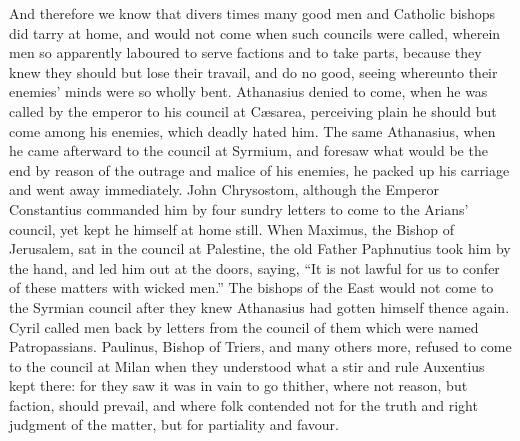 And therefore we know that divers times many good men and Catholic
bishops did tarry at home, and would not come when such councils were
called, wherein men so apparently laboured to serve factions and to
take parts, because they knew they should but lose their travail, and
do no good, seeing whereunto their enemies’ minds were so wholly
bent. Athanasius denied to come, when he was called by the emperor
to his council at Cæsarea, perceiving plain he should but come
among his enemies, which deadly hated him. The same Athanasius,
when he came afterward to the council at Syrmium, and foresaw what would
be the end by reason of the outrage and malice of his enemies, he packed
up his carriage and went away immediately. John Chrysostom, although
the Emperor Constantius commanded him by four sundry
letters to come to the Arians’ council, yet kept he himself at
home still. When Maximus, the Bishop of Jerusalem, sat in the
council at Palestine, the old Father Paphnutius took him by the hand,
and led him out at the doors, saying, “It is not lawful for us
to confer of these matters with wicked men.” The bishops
of the East would not come to the Syrmian council after they knew Athanasius
had gotten himself thence again. Cyril called men back by letters
from the council of them which were named Patropassians. Paulinus,
Bishop of Triers, and many others more, refused to come to the council
at Milan when they understood what a stir and rule Auxentius kept there:
for they saw it was in vain to go thither, where not reason, but faction,
should prevail, and where folk contended not for the truth and right
judgment of the matter, but for partiality and favour.

